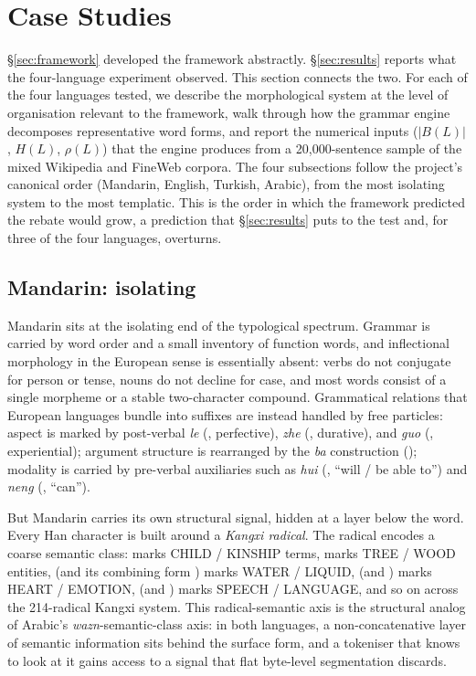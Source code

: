 \section{Case Studies}
\label{sec:cases}

\S\ref{sec:framework} developed the framework abstractly. \S\ref{sec:results} reports what the four-language experiment observed. This section connects the two. For each of the four languages tested, we describe the morphological system at the level of organisation relevant to the framework, walk through how the grammar engine decomposes representative word forms, and report the numerical inputs ($|B(L)|$, $H(L)$, $\rho(L)$) that the engine produces from a 20{,}000-sentence sample of the mixed Wikipedia and FineWeb corpora. The four subsections follow the project's canonical order (Mandarin, English, Turkish, Arabic), from the most isolating system to the most templatic. This is the order in which the framework predicted the rebate would grow, a prediction that \S\ref{sec:results} puts to the test and, for three of the four languages, overturns.

\subsection{Mandarin: isolating}
\label{sec:cases-zh}

Mandarin sits at the isolating end of the typological spectrum. Grammar is carried by word order and a small inventory of function words, and inflectional morphology in the European sense is essentially absent: verbs do not conjugate for person or tense, nouns do not decline for case, and most words consist of a single morpheme or a stable two-character compound. Grammatical relations that European languages bundle into suffixes are instead handled by free particles: aspect is marked by post-verbal \emph{le} (, perfective), \emph{zhe} (, durative), and \emph{guo} (, experiential); argument structure is rearranged by the \emph{ba} construction (); modality is carried by pre-verbal auxiliaries such as \emph{hui} (, ``will / be able to'') and \emph{neng} (, ``can'').

But Mandarin carries its own structural signal, hidden at a layer below the word. Every Han character is built around a \emph{Kangxi radical}. The radical encodes a coarse semantic class:  marks CHILD / KINSHIP terms,  marks TREE / WOOD entities,  (and its combining form ) marks WATER / LIQUID,  (and ) marks HEART / EMOTION,  (and ) marks SPEECH / LANGUAGE, and so on across the 214-radical Kangxi system. This radical-semantic axis is the structural analog of Arabic's \emph{wazn}-semantic-class axis: in both languages, a non-concatenative layer of semantic information sits behind the surface form, and a tokeniser that knows to look at it gains access to a signal that flat byte-level segmentation discards.

